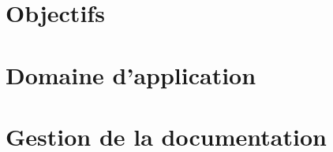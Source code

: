 

\newcommand{\mainTitle}{\'Etude préalable - SPIE}
\newcommand{\secondTitle}{Plan Assurance Qualité}
\newcommand{\documentRef}{PAQ/4401/1}





\tableofcontents
\listoffigures
\newpage


%



\part{Objectifs}
\setcounter{section}{0}

\part{Domaine d’application}
\setcounter{section}{0}

\part{Gestion de la documentation}
\setcounter{section}{0}

